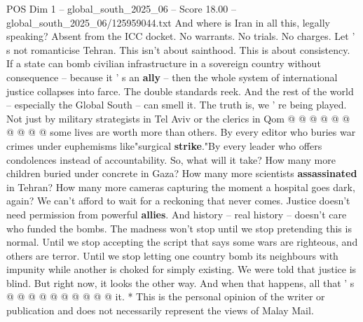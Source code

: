 \begin{textsample}{POS Dim 1 – global\_south\_2025\_06 – Score 18.00 – global\_south\_2025\_06/125959044.txt}
And where is Iran in all this, legally speaking?
Absent from the ICC docket.
No warrants.
No trials.
No charges.
Let ' s not romanticise Tehran.
This isn't about sainthood.
This is about consistency.
If a state can bomb civilian infrastructure in a sovereign country without consequence -- because it ' s an \textbf{ally} -- then the whole system of international justice collapses into farce.
The double standards reek.
And the rest of the world -- especially the Global South -- can smell it.
The truth is, we ' re being played.
Not just by military strategists in Tel Aviv or the clerics in Qom @ @ @ @ @ @ @ @ @ @ some lives are worth more than others.
By every editor who buries war crimes under euphemisms like"surgical \textbf{strike}."By every leader who offers condolences instead of accountability.
So, what will it take?
How many more children buried under concrete in Gaza?
How many more scientists \textbf{assassinated} in Tehran?
How many more cameras capturing the moment a hospital goes dark, again?
We can't afford to wait for a reckoning that never comes.
Justice doesn't need permission from powerful \textbf{allies}.
And history -- real history -- doesn't care who funded the bombs.
The madness won't stop until we stop pretending this is normal.
Until we stop accepting the script that says some wars are righteous, and others are terror.
Until we stop letting one country bomb its neighbours with impunity while another is choked for simply existing.
We were told that justice is blind.
But right now, it looks the other way.
And when that happens, all that ' s @ @ @ @ @ @ @ @ @ @ it. * This is the personal opinion of the writer or publication and does not necessarily represent the views of Malay Mail.

\end{textsample}
